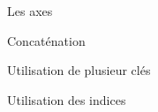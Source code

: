 \begin{frame}{Les axes}
\end{frame}

\begin{frame}{Concaténation}
  
\end{frame}

\begin{frame}{Utilisation de plusieur clés}
  
\end{frame}

\begin{frame}{Utilisation des indices}
  
\end{frame}
